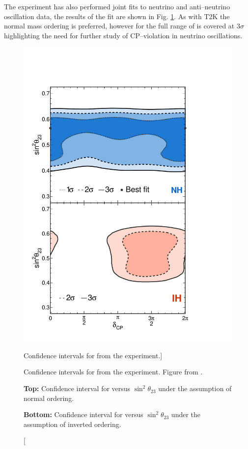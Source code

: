 The \nova{} experiment has also performed joint fits to neutrino and
anti--neutrino oscillation data, the results of the fit are shown in Fig.
\ref{fig:nova_cp}. As with T2K the normal mass ordering is preferred, however
for \nova{} the full range of \dcp{} is covered at $3\sigma$ highlighting the 
need for further study of CP--violation in neutrino 
oscillations\cite{PhysRevLett.123.151803}.

\begin{figure}

	\centering

	\includegraphics[height=0.75\textheight]{figures/nova_dcp.pdf}

	\caption
	[Confidence intervals for \dcp{} from the \nova{} experiment.]
	{Confidence intervals for \dcp{} from the \nova{} experiment. Figure from 
	\cite{PhysRevLett.123.151803}.

	\medskip
	\textbf{Top:} Confidence interval for \dcp{} versus $\sin^2\theta_{23}$ under the
	assumption of normal ordering.

	\medskip
	\textbf{Bottom:} Confidence interval for \dcp{} versus $\sin^2\theta_{23}$ under the
	assumption of inverted ordering.
	}
	\label{fig:nova_cp}
\end{figure}

